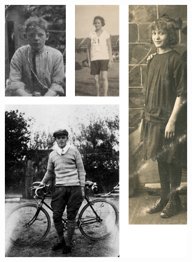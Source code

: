 \documentclass[12pt,twoside]{memoir}
\begin{document}
\begin{figure}
\includegraphics[width=\textwidth]{img/ch4/ouders1}
\caption*{\footnotesize }
\end{figure}
\end{document}

